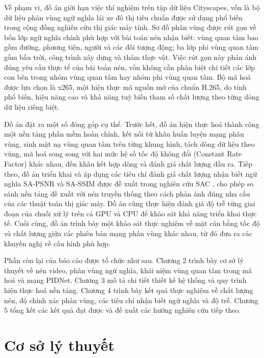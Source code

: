 Về phạm vi, đồ án giới hạn việc thí nghiệm trên tập dữ liệu Cityscapes, vốn là bộ dữ liệu phân vùng ngữ nghĩa lái xe đô thị tiêu chuẩn được sử dụng phổ biến trong cộng đồng nghiên cứu thị giác máy tính. Sơ đồ phân vùng được rút gọn về bốn lớp ngữ nghĩa chính phù hợp với bài toán nén nhận biết: vùng quan tâm bao gồm đường, phương tiện, người và các đối tượng động; ba lớp phi vùng quan tâm gồm bầu trời, công trình xây dựng và thảm thực vật. Việc rút gọn này phản ánh đúng yêu cầu thực tế của bài toán nén, vốn không cần phân biệt chi tiết các lớp con bên trong nhóm vùng quan tâm hay nhóm phi vùng quan tâm. Bộ mã hoá được lựa chọn là x265, một hiện thực mã nguồn mở của chuẩn H.265, do tính phổ biến, hiệu năng cao và khả năng tuỳ biến tham số chất lượng theo từng dòng dữ liệu riêng biệt.

Đồ án đặt ra một số đóng góp cụ thể. Trước hết, đồ án hiện thực hoá thành công một nền tảng phần mềm hoàn chỉnh, kết nối từ khâu huấn luyện mạng phân vùng, sinh mặt nạ vùng quan tâm trên từng khung hình, tách dòng dữ liệu theo vùng, mã hoá song song với hai mức hệ số tốc độ không đổi (Constant Rate Factor) khác nhau, đến khâu kết hợp dòng và đánh giá chất lượng đầu ra. Tiếp theo, đồ án triển khai và áp dụng các tiêu chí đánh giá chất lượng nhận biết ngữ nghĩa SA-PSNR và SA-SSIM được đề xuất trong nghiên cứu SAC \cite{SAC}, cho phép so sánh nền tảng đề xuất với nén truyền thống theo cách phản ánh đúng nhu cầu của các thuật toán thị giác máy. Đồ án cũng thực hiện đánh giá độ trễ từng giai đoạn của chuỗi xử lý trên cả GPU và CPU để khảo sát khả năng triển khai thực tế. Cuối cùng, đồ án trình bày một khảo sát thực nghiệm về mặt cân bằng tốc độ và chất lượng giữa các phiên bản mạng phân vùng khác nhau, từ đó đưa ra các khuyến nghị về cấu hình phù hợp.

Phần còn lại của báo cáo được tổ chức như sau. Chương 2 trình bày cơ sở lý thuyết về nén video, phân vùng ngữ nghĩa, khái niệm vùng quan tâm trong mã hoá và mạng PIDNet. Chương 3 mô tả chi tiết thiết kế hệ thống và quy trình hiện thực hoá nền tảng. Chương 4 trình bày kết quả thực nghiệm về chất lượng nén, độ chính xác phân vùng, các tiêu chí nhận biết ngữ nghĩa và độ trễ. Chương 5 tổng kết các kết quả đạt được và đề xuất các hướng nghiên cứu tiếp theo.


\chapter{Cơ sở lý thuyết}

